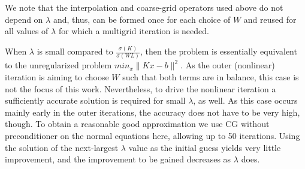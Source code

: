 We note that the interpolation and coarse-grid operators used above do
not depend on $\lambda$ and, thus, can be formed once for each choice
of $W$ and reused for all values of $\lambda$ for which a multigrid
iteration is needed.

When $\lambda$ is small compared to $\frac{\sigma(K)}{\sigma(WL)}$,
then the problem is essentially equivalent to the unregularized
problem $min_x \|Kx-b\|^2$. As the outer (nonlinear) iteration is
aiming to choose $W$ such that both terms are in balance, this case is
not the focus of this work. Nevertheless, to drive the nonlinear
iteration a sufficiently accurate solution is required for small
$\lambda$, as well. As this case occurs mainly early in the outer
iterations, the accuracy does not have to be very high, though. To
obtain a reasonable good approximation we use CG without
preconditioner on the normal equations here, allowing up to 50
iterations. Using the solution of the next-largest $\lambda$ value as
the initial guess yields very little improvement, and the improvement
to be gained decreases as $\lambda$ does.

